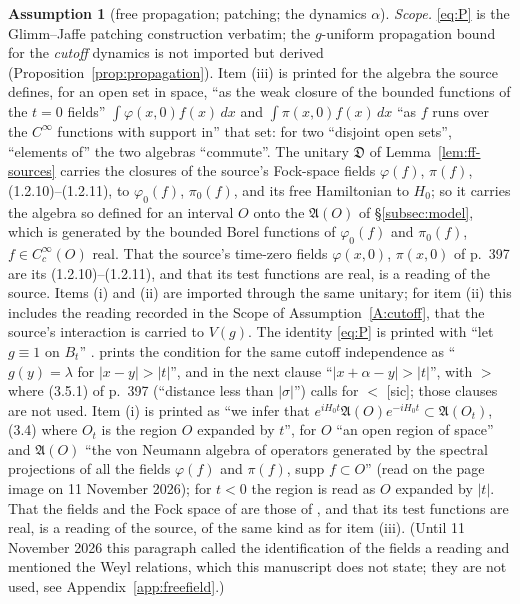 \documentclass[11pt,a4paper]{article}
\theoremstyle{plain}
\theoremstyle{definition}
\newtheorem{assumption}{Assumption}
\theoremstyle{plain}
\theoremstyle{definition}
\newcommand{\A}{\mathfrak{A}}
\begin{document}
\begin{assumption}[free propagation; patching; the dynamics $\alpha$]
\emph{Scope.} \eqref{eq:P} is the Glimm--Jaffe patching construction verbatim; the
$g$-uniform propagation bound for the \emph{cutoff} dynamics is not imported but derived
(Proposition~\ref{prop:propagation}).  Item (iii) is printed for the algebra the source
defines, for an open set in space, ``as the weak closure of the bounded functions of the
$t=0$ fields'' $\int\varphi(x,0)f(x)\,dx$ and $\int\pi(x,0)f(x)\,dx$ ``as $f$ runs over the
$C^\infty$ functions with support in'' that set: for two ``disjoint open sets'', ``elements
of'' the two algebras ``commute''.  The unitary $\mathfrak D$ of Lemma~\ref{lem:ff-sources}
carries the closures of the source's Fock-space fields $\varphi(f)$, $\pi(f)$,
(1.2.10)--(1.2.11), to $\varphi_0(f)$, $\pi_0(f)$, and its free Hamiltonian to $H_0$; so it
carries the algebra so defined for an interval $O$ onto the $\A(O)$ of
\S\ref{subsec:model}, which is generated by the bounded Borel functions of $\varphi_0(f)$ and
$\pi_0(f)$, $f\in C_c^\infty(O)$ real.  That the source's time-zero fields $\varphi(x,0)$,
$\pi(x,0)$ of p.~397 are its (1.2.10)--(1.2.11), and that its test functions are real, is a
reading of the source.  Items (i) and (ii) are imported through the same unitary; for item
(ii) this includes the reading recorded in the Scope of Assumption~\ref{A:cutoff}, that the
source's interaction is carried to $V(g)$.  The identity \eqref{eq:P} is printed with ``let
$g\equiv1$ on $B_t$'' \cite[Thm.~4.1.2, p.~42]{GJExp}.  \cite[p.~398]{GJ2} prints the
condition for the same cutoff independence as ``$g(y)=\lambda$ for $|x-y|>|t|$'', and in the
next clause ``$|x+\alpha-y|>|t|$'', with $>$ where (3.5.1) of p.~397 (``distance less than
$|\sigma|$'') calls for $<$ [sic]; those clauses are not used.  Item (i) is printed as ``we
infer that $e^{iH_0t}\mathfrak A(O)e^{-iH_0t}\subset\mathfrak A(O_t)$, (3.4) where $O_t$ is
the region $O$ expanded by $t$'', for $O$ ``an open region of space'' and $\mathfrak A(O)$
``the von Neumann algebra of operators generated by the spectral projections of all the
fields $\varphi(f)$ and $\pi(f)$, supp $f\subset O$'' \cite[\S III, p.~1948]{GJ1} (read on the
page image on 11 November 2026); for $t<0$ the region is read as $O$ expanded by $|t|$.  That
the fields and the Fock space of \cite{GJ1} are those of \cite[(1.2.1)--(1.2.11)]{GJ2}, and
that its test functions are real, is a reading of the source, of the same kind as for item
(iii).  (Until 11 November 2026 this paragraph called the identification of the fields a
reading and mentioned the Weyl relations, which this manuscript does not state; they are not
used, see Appendix~\ref{app:freefield}.)


\end{assumption}
\end{document}
